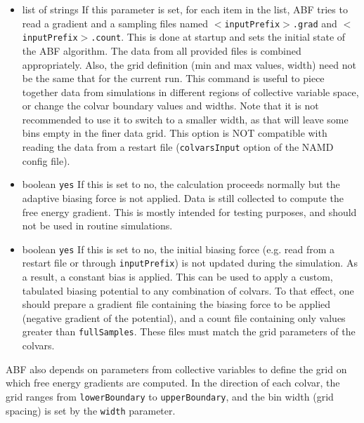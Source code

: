 \begin{itemize}
\item {}
  {list of strings}
  {If this parameter is set, for each item in the list, ABF tries to read
    a gradient and a sampling files named \texttt{$<$inputPrefix$>$.grad}
    and \texttt{$<$inputPrefix$>$.count}. This is done at
    startup and sets the initial state of the ABF algorithm.
    The data from all provided files is combined appropriately.
    Also, the grid definition (min and max values, width) need not be the same
    that for the current run. This command is useful to piece together
    data from simulations in different regions of collective variable space,
    or change the colvar boundary values and widths. Note that it is not
    recommended to use it to switch to a smaller width, as that will leave
    some bins empty in the finer data grid.
    This option is NOT compatible with reading the data from a restart file
    (\texttt{colvarsInput} option of the NAMD config file).}

\item {}
  {boolean}
  {\texttt{yes}}
  { If this is set to no, the calculation proceeds normally but the adaptive
    biasing force is not applied. Data is still collected to compute
    the free energy gradient. This is mostly intended for testing purposes, and should
    not be used in routine simulations.
  }

\item {}
  {boolean}
  {\texttt{yes}}
  { If this is set to no, the initial biasing force (e.g. read from a restart file or 
    through \texttt{inputPrefix}) is not updated during the simulation.
    As a result, a constant bias is applied. This can be used to apply a custom, tabulated
    biasing potential to any combination of colvars. To that effect, one should prepare
    a gradient file containing the biasing force to be applied (negative gradient
    of the potential), and a count file containing only values greater than
    \texttt{fullSamples}. These files must match the grid parameters of the colvars.
  }
\end{itemize}

ABF also depends on parameters from collective variables to define the grid on which free
energy gradients are computed. In the direction of each colvar, the grid ranges from
\texttt{lowerBoundary} to \texttt{upperBoundary}, and the bin width (grid spacing)
is set by the \texttt{width} parameter.


